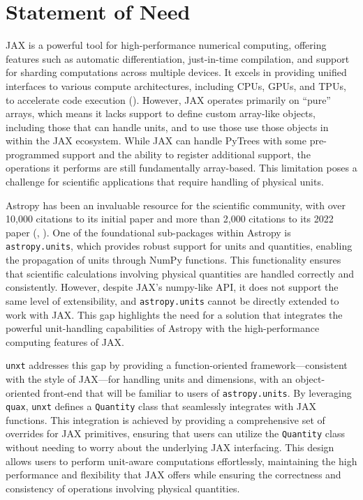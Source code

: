 \documentclass[
]{article}
\begin{document}
\section{Statement of Need}\label{statement-of-need}

JAX is a powerful tool for high-performance numerical computing,
offering features such as automatic differentiation, just-in-time
compilation, and support for sharding computations across multiple
devices. It excels in providing unified interfaces to various compute
architectures, including CPUs, GPUs, and TPUs, to accelerate code
execution (). However, JAX
operates primarily on ``pure'' arrays, which means it lacks support to
define custom array-like objects, including those that can handle units,
and to use those use those objects in within the JAX ecosystem. While
JAX can handle PyTrees with some pre-programmed support and the ability
to register additional support, the operations it performs are still
fundamentally array-based. This limitation poses a challenge for
scientific applications that require handling of physical units.

Astropy has been an invaluable resource for the scientific community,
with over 10,000 citations to its initial paper and more than 2,000
citations to its 2022 paper (, ). One of
the foundational sub-packages within Astropy is \texttt{astropy.units},
which provides robust support for units and quantities, enabling the
propagation of units through NumPy functions. This functionality ensures
that scientific calculations involving physical quantities are handled
correctly and consistently. However, despite JAX's numpy-like API, it
does not support the same level of extensibility, and
\texttt{astropy.units} cannot be directly extended to work with JAX.
This gap highlights the need for a solution that integrates the powerful
unit-handling capabilities of Astropy with the high-performance
computing features of JAX.

\texttt{unxt} addresses this gap by providing a function-oriented
framework---consistent with the style of JAX---for handling units and
dimensions, with an object-oriented front-end that will be familiar to
users of \texttt{astropy.units}. By leveraging \texttt{quax},
\texttt{unxt} defines a \texttt{Quantity} class that seamlessly
integrates with JAX functions. This integration is achieved by providing
a comprehensive set of overrides for JAX primitives, ensuring that users
can utilize the \texttt{Quantity} class without needing to worry about
the underlying JAX interfacing. This design allows users to perform
unit-aware computations effortlessly, maintaining the high performance
and flexibility that JAX offers while ensuring the correctness and
consistency of operations involving physical quantities.
\end{document}
